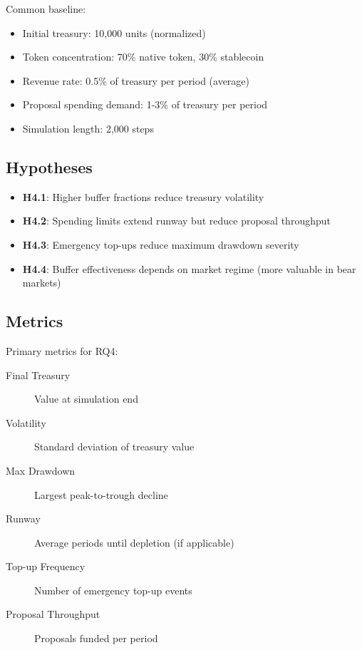 Common baseline:

\begin{itemize}
    \item Initial treasury: 10,000 units (normalized)
    \item Token concentration: 70\% native token, 30\% stablecoin
    \item Revenue rate: 0.5\% of treasury per period (average)
    \item Proposal spending demand: 1-3\% of treasury per period
    \item Simulation length: 2,000 steps
\end{itemize}

\subsection{Hypotheses}

\begin{itemize}
    \item \textbf{H4.1}: Higher buffer fractions reduce treasury volatility
    \item \textbf{H4.2}: Spending limits extend runway but reduce proposal throughput
    \item \textbf{H4.3}: Emergency top-ups reduce maximum drawdown severity
    \item \textbf{H4.4}: Buffer effectiveness depends on market regime (more valuable in bear markets)
\end{itemize}

\subsection{Metrics}

Primary metrics for RQ4:

\begin{description}
    \item[Final Treasury] Value at simulation end
    \item[Volatility] Standard deviation of treasury value
    \item[Max Drawdown] Largest peak-to-trough decline
    \item[Runway] Average periods until depletion (if applicable)
    \item[Top-up Frequency] Number of emergency top-up events
    \item[Proposal Throughput] Proposals funded per period
\end{description}

